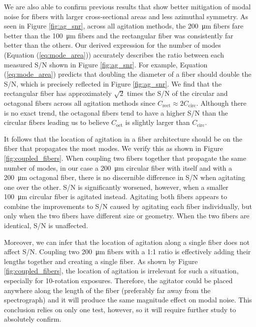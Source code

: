 We are also able to confirm previous results that show better mitigation of modal noise for fibers with larger cross-sectional areas and less azimuthal symmetry. As seen in Figure \ref{fig:ag_snr}, across all agitation methods, the \SI{200}{\micro\meter} fibers fare better than the \SI{100}{\micro\meter} fibers and the rectangular fiber was consistently far better than the others. Our derived expression for the number of modes (Equation (\ref{eq:mode_area})) accurately describes the ratio between each measured S/N shown in Figure \ref{fig:ag_snr}. For example, Equation (\ref{eq:mode_area}) predicts that doubling the diameter of a fiber should double the S/N, which is precisely reflected in Figure \ref{fig:ag_snr}. We find that the rectangular fiber has approximately $\sqrt{2}$ times the S/N of the circular and octagonal fibers across all agitation methods since $C_\mathrm{rect} \approx 2C_\mathrm{circ}$. Although there is no exact trend, the octagonal fibers tend to have a higher S/N than the circular fibers leading us to believe $C_\mathrm{oct}$ is slightly larger than $C_\mathrm{circ}$.

It follows that the location of agitation in a fiber architecture should be on the fiber that propagates the most modes. We verify this as shown in Figure \ref{fig:coupled_fibers}. When coupling two fibers together that propagate the same number of modes, in our case a \SI{200}{\micro\meter} circular fiber with itself and with a \SI{200}{\micro\meter} octagonal fiber, there is no discernible difference in S/N when agitating one over the other. S/N is significantly worsened, however, when a smaller \SI{100}{\micro\meter} circular fiber is agitated instead. Agitating both fibers appears to combine the improvements to S/N caused by agitating each fiber individually, but only when the two fibers have different size or geometry. When the two fibers are identical, S/N is unaffected.

Moreover, we can infer that the location of agitation along a single fiber does not affect S/N. Coupling two \SI{200}{\micro\meter} fibers with a 1:1 ratio is effectively adding their lengths together and creating a single fiber. As shown by Figure \ref{fig:coupled_fibers}, the location of agitation is irrelevant for such a situation, especially for 10-rotation exposures. Therefore, the agitator could be placed anywhere along the length of the fiber (preferably far away from the spectrograph) and it will produce the same magnitude effect on modal noise. This conclusion relies on only one test, however, so it will require further study to absolutely confirm.

